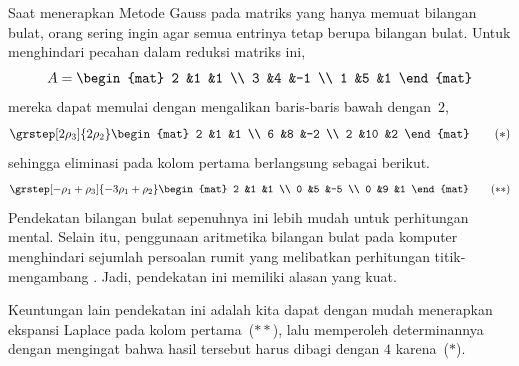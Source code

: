
Saat menerapkan Metode Gauss pada matriks yang hanya memuat bilangan bulat,
orang sering ingin agar semua entrinya tetap berupa bilangan bulat.
Untuk menghindari pecahan dalam reduksi matriks ini,
\begin{equation*}
  A=
  \begin{mat}
    2 &1 &1 \\
    3 &4 &-1 \\
    1 &5 &1 
  \end{mat}
\end{equation*}
mereka dapat memulai dengan mengalikan baris-baris bawah dengan~$2$,
\begin{equation*}
  \grstep[2\rho_3]{2\rho_2}
  \begin{mat}
    2 &1 &1 \\
    6 &8 &-2 \\
    2 &10 &2 
  \end{mat}
  \tag{$*$}
\end{equation*}
sehingga eliminasi pada kolom pertama berlangsung sebagai berikut.
\begin{equation*}
  \grstep[-\rho_1+\rho_3]{-3\rho_1+\rho_2}
  \begin{mat}
    2 &1 &1 \\
    0 &5 &-5 \\
    0 &9 &1
  \end{mat}
  \tag{$**$}
\end{equation*}
Pendekatan bilangan bulat sepenuhnya ini lebih mudah untuk perhitungan mental.
Selain itu, penggunaan aritmetika bilangan bulat pada komputer menghindari
sejumlah persoalan rumit yang melibatkan perhitungan titik-mengambang
\cite{Kahan}.
Jadi, pendekatan ini memiliki alasan yang kuat.

Keuntungan lain pendekatan ini adalah kita dapat dengan mudah menerapkan
ekspansi Laplace pada kolom pertama~($**$), lalu memperoleh determinannya
dengan mengingat bahwa hasil tersebut harus dibagi dengan $4$ karena~($*$).

